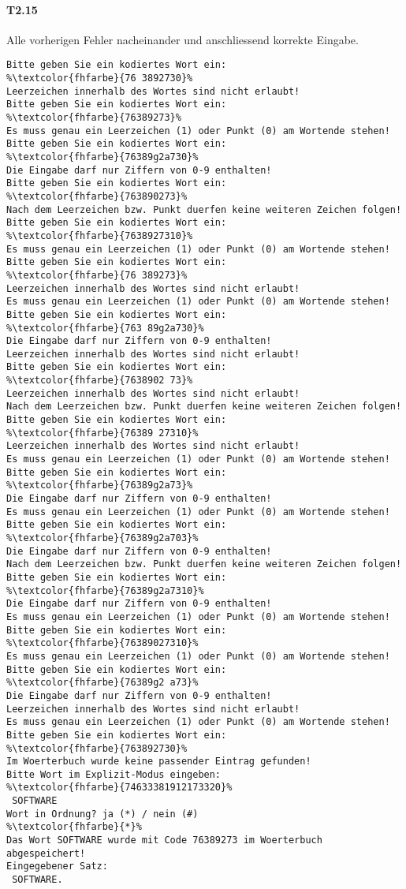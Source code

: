 \paragraph*{T2.15} Alle vorherigen Fehler nacheinander und anschliessend korrekte Eingabe.
\begin{lstlisting}[escapechar=\%]
Bitte geben Sie ein kodiertes Wort ein:
%\textcolor{fhfarbe}{76 3892730}%
Leerzeichen innerhalb des Wortes sind nicht erlaubt!
Bitte geben Sie ein kodiertes Wort ein:
%\textcolor{fhfarbe}{76389273}%
Es muss genau ein Leerzeichen (1) oder Punkt (0) am Wortende stehen!
Bitte geben Sie ein kodiertes Wort ein:
%\textcolor{fhfarbe}{76389g2a730}%
Die Eingabe darf nur Ziffern von 0-9 enthalten!
Bitte geben Sie ein kodiertes Wort ein:
%\textcolor{fhfarbe}{763890273}%
Nach dem Leerzeichen bzw. Punkt duerfen keine weiteren Zeichen folgen!
Bitte geben Sie ein kodiertes Wort ein:
%\textcolor{fhfarbe}{7638927310}%
Es muss genau ein Leerzeichen (1) oder Punkt (0) am Wortende stehen!
Bitte geben Sie ein kodiertes Wort ein:
%\textcolor{fhfarbe}{76 389273}%
Leerzeichen innerhalb des Wortes sind nicht erlaubt!
Es muss genau ein Leerzeichen (1) oder Punkt (0) am Wortende stehen!
Bitte geben Sie ein kodiertes Wort ein:
%\textcolor{fhfarbe}{763 89g2a730}%
Die Eingabe darf nur Ziffern von 0-9 enthalten!
Leerzeichen innerhalb des Wortes sind nicht erlaubt!
Bitte geben Sie ein kodiertes Wort ein:
%\textcolor{fhfarbe}{7638902 73}%
Leerzeichen innerhalb des Wortes sind nicht erlaubt!
Nach dem Leerzeichen bzw. Punkt duerfen keine weiteren Zeichen folgen!
Bitte geben Sie ein kodiertes Wort ein:
%\textcolor{fhfarbe}{76389 27310}%
Leerzeichen innerhalb des Wortes sind nicht erlaubt!
Es muss genau ein Leerzeichen (1) oder Punkt (0) am Wortende stehen!
Bitte geben Sie ein kodiertes Wort ein:
%\textcolor{fhfarbe}{76389g2a73}%
Die Eingabe darf nur Ziffern von 0-9 enthalten!
Es muss genau ein Leerzeichen (1) oder Punkt (0) am Wortende stehen!
Bitte geben Sie ein kodiertes Wort ein:
%\textcolor{fhfarbe}{76389g2a703}%
Die Eingabe darf nur Ziffern von 0-9 enthalten!
Nach dem Leerzeichen bzw. Punkt duerfen keine weiteren Zeichen folgen!
Bitte geben Sie ein kodiertes Wort ein:
%\textcolor{fhfarbe}{76389g2a7310}%
Die Eingabe darf nur Ziffern von 0-9 enthalten!
Es muss genau ein Leerzeichen (1) oder Punkt (0) am Wortende stehen!
Bitte geben Sie ein kodiertes Wort ein:
%\textcolor{fhfarbe}{76389027310}%
Es muss genau ein Leerzeichen (1) oder Punkt (0) am Wortende stehen!
Bitte geben Sie ein kodiertes Wort ein:
%\textcolor{fhfarbe}{76389g2 a73}%
Die Eingabe darf nur Ziffern von 0-9 enthalten!
Leerzeichen innerhalb des Wortes sind nicht erlaubt!
Es muss genau ein Leerzeichen (1) oder Punkt (0) am Wortende stehen!
Bitte geben Sie ein kodiertes Wort ein:
%\textcolor{fhfarbe}{763892730}%
Im Woerterbuch wurde keine passender Eintrag gefunden!
Bitte Wort im Explizit-Modus eingeben:
%\textcolor{fhfarbe}{74633381912173320}%
 SOFTWARE
Wort in Ordnung? ja (*) / nein (#)
%\textcolor{fhfarbe}{*}%
Das Wort SOFTWARE wurde mit Code 76389273 im Woerterbuch abgespeichert!
Eingegebener Satz:
 SOFTWARE.
\end{lstlisting}

